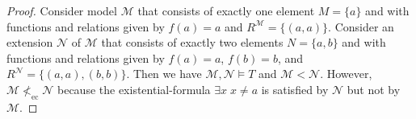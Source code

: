 \documentclass{article}
\begin{document}
\begin{enumerate}[label={\bf Q\arabic*:}]
\begin{enumerate}
\begin{proof}
          Consider model $\mathcal{M}$ that consists of exactly one element
          $M=\{a\}$ and with functions and relations given by $f(a)=a$ and
          $R^{\mathcal{M}}=\{(a,a)\}$. Consider an extension $\mathcal{N}$
          of $\mathcal{M}$ that consists of exactly two elements
          $N=\{a,b\}$ and with functions and relations given by $f(a)=a$,
          $f(b)=b$, and $R^{\mathcal{N}}=\{(a,a),(b,b)\}$. Then we have
          $\mathcal{M},\mathcal{N}\models T$ and $\mathcal{M}<\mathcal{N}$.
          However, $\mathcal{M}\not<_{\text{ec}}\mathcal{N}$ because
          the existential-formula $\exists x\; x\neq a$ is satisfied by
          $\mathcal{N}$ but not by $\mathcal{M}$.


        \end{proof}
    \end{enumerate}
\end{enumerate}
\end{document}
